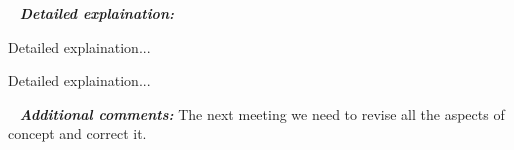    \newline
  \textit{\textbf{Detailed explaination:}}
  \begin{enumerate*}
  	\item Detailed explaination...
  	\begin{figure}[H]
  		\begin{minipage}[h]{1\linewidth}
  			\caption{}
  		\end{minipage}
  	\end{figure}
  	
  	\item Detailed explaination...
  	\begin{figure}[H]
  		\begin{minipage}[h]{1\linewidth}
  			\caption{}
  		\end{minipage}
  	\end{figure}
  	
  \end{enumerate*}
  
   \newline
  \textit{\textbf{Additional comments:}} The next meeting we need to revise all the aspects of concept and correct it.
  
\fillpage
